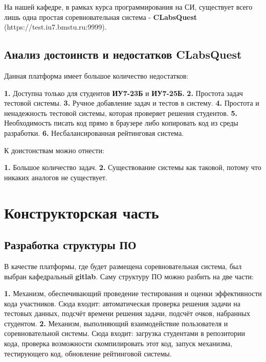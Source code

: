 \documentclass[a4paper,12pt]{article}
\begin{document}
\noindent На нашей кафедре, в рамках курса программирования на СИ, существует всего лишь одна простая соревновательная система - \textbf{CLabsQuest} (https://test.iu7.bmstu.ru:9999).

\subsection{Анализ достоинств и недостатков CLabsQuest}

\noindent Данная платформа имеет большое количество недостатков:\newline

\noindent \textbf{1.} Доступна только для студентов \textbf{ИУ7-23Б} и \textbf{ИУ7-25Б.}\newline
\noindent \textbf{2.} Простота задач тестовой системы.\newline
\noindent \textbf{3.} Ручное добавление задач и тестов в систему.\newline
\noindent \textbf{4.} Простота и ненадежность тестовой системы, которая проверяет решения студентов.\newline
\noindent \textbf{5.} Необходимость писать код прямо в браузере либо копировать код из среды разработки.\newline
\noindent \textbf{6.} Несбалансированная рейтинговая система.\newline\newline

\noindent К доистонствам можно отнести:\newline

\noindent \textbf{1.} Большое количество задач.\newline
\noindent \textbf{2.} Существование системы как таковой, потому что никаких аналогов не существует.

\section{Конструкторская часть}

\subsection{Разработка структуры ПО}

\noindent В качестве платформы, где будет размещена соревновательная система, был выбран кафедральный \textbf{gitlab}. Саму структуру ПО можно разбить на две части: \newline

\noindent \textbf{1.} Механизм, обеспечивающий проведение тестирования и оценки эффективности кода участников. Сюда входит: автоматическая проверка решения задачи на тестовых данных, подсчёт времени решения задачи, подсчёт очков, набранных студентом. \newline
\noindent \textbf{2.} Механизм, выполняющий взаимодействие пользователя и соревновательной системы. Сюда входит:  загрузка студентами в репозитории кода, проверка возможности скомпилировать этот код, запуск механизма, тестирующего код, обновление рейтинговой системы.
\end{document}
